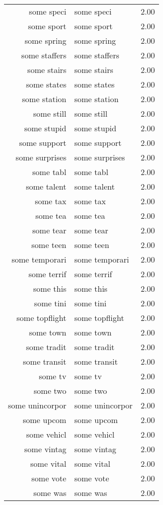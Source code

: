 \begin{table}[ht]
\begin{tabular}{rlr}
  some speci & some speci & 2.00 \\ 
  some sport & some sport & 2.00 \\ 
  some spring & some spring & 2.00 \\ 
  some staffers & some staffers & 2.00 \\ 
  some stairs & some stairs & 2.00 \\ 
  some states & some states & 2.00 \\ 
  some station & some station & 2.00 \\ 
  some still & some still & 2.00 \\ 
  some stupid & some stupid & 2.00 \\ 
  some support & some support & 2.00 \\ 
  some surprises & some surprises & 2.00 \\ 
  some tabl & some tabl & 2.00 \\ 
  some talent & some talent & 2.00 \\ 
  some tax & some tax & 2.00 \\ 
  some tea & some tea & 2.00 \\ 
  some tear & some tear & 2.00 \\ 
  some teen & some teen & 2.00 \\ 
  some temporari & some temporari & 2.00 \\ 
  some terrif & some terrif & 2.00 \\ 
  some this & some this & 2.00 \\ 
  some tini & some tini & 2.00 \\ 
  some topflight & some topflight & 2.00 \\ 
  some town & some town & 2.00 \\ 
  some tradit & some tradit & 2.00 \\ 
  some transit & some transit & 2.00 \\ 
  some tv & some tv & 2.00 \\ 
  some two & some two & 2.00 \\ 
  some unincorpor & some unincorpor & 2.00 \\ 
  some upcom & some upcom & 2.00 \\ 
  some vehicl & some vehicl & 2.00 \\ 
  some vintag & some vintag & 2.00 \\ 
  some vital & some vital & 2.00 \\ 
  some vote & some vote & 2.00 \\ 
  some was & some was & 2.00 \\ 

\end{tabular}
\end{table}
